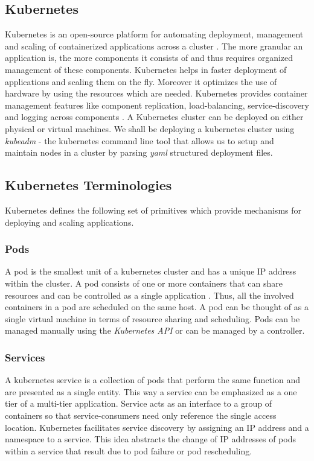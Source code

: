 \documentclass[9pt,twocolumn,twoside]{../../styles/osajnl}
\begin{document}
\subsection{Kubernetes}
Kubernetes is an open-source platform for automating deployment,
management and scaling of containerized applications across a cluster
\cite{www-wiki-kubernetes}. The more granular an application is, the
more components it consists of and thus requires organized management
of these components. Kubernetes helps in faster deployment of
applications and scaling them on the fly. Moreover it optimizes the
use of hardware by using the resources which are needed. Kubernetes
provides container management features like component replication,
load-balancing, service-discovery and logging across components
\cite{www-kubernetes-architecture}. A Kubernetes cluster can be
deployed on either physical or virtual machines. We shall be deploying
a kubernetes cluster using \emph{kubeadm} - the kubernetes command
line tool that allows us to setup and maintain nodes in a cluster by
parsing \emph{yaml} structured deployment files.

\subsection{Kubernetes Terminologies}
Kubernetes defines the following set of primitives which provide
mechanisms for deploying and scaling applications.

\subsubsection{Pods}
A pod is the smallest unit of a kubernetes cluster and has a unique
IP address within the cluster. A pod consists of one or more
containers that can share resources and can be controlled as a single
application \cite{www-wiki-kubernetes}
\cite{www-kubernetes-digitalocean}. Thus, all the involved containers
in a pod are scheduled on the same host. A pod can be thought of as a
single virtual machine in terms of resource sharing and scheduling.
Pods can be managed manually using the \emph{Kubernetes API} or can be
managed by a controller.

\subsubsection{Services}
A kubernetes service is a collection of pods that perform the same
function and are presented as a single entity. This way a service can
be emphasized as a one tier of a multi-tier application. Service acts
as an interface to a group of containers so that service-consumers
need only reference the single access location. Kubernetes facilitates
service discovery by assigning an IP address and a namespace to
a service. This idea abstracts the change of IP addresses of pods
within a service that result due to pod failure or pod rescheduling.
\end{document}
